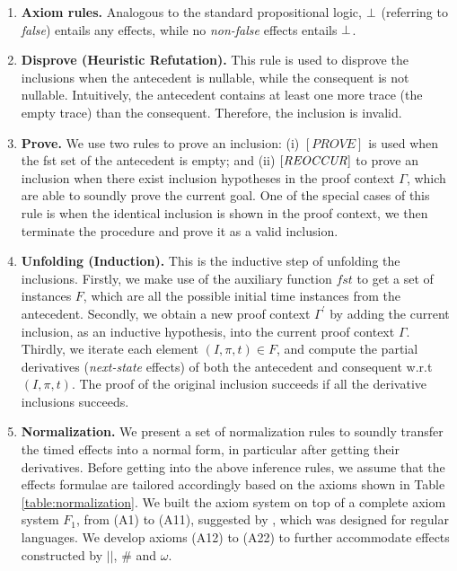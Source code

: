 \documentclass[acmsmall,review,anonymous]{acmart}\settopmatter{printfolios=true,printccs=false,printacmref=false}
\newcommand{\code}[1]{{\tt{\ensuremath{\m{#1}}}}}
\newcommand{\codeme}[1]{{\tt{\ensuremath{#1}}}}
\newcommand{\bott}{\textcolor{black}{\ensuremath{\bot}}}
\newcommand{\m}{\mathit}
\newcommand\tabref[1]{Table \textcolor{black}{\ref{#1}}.}
\begin{document}
\begin{enumerate}
\item 
\textbf{Axiom rules.}
\label{Base}
Analogous to  the standard propositional logic, \code{\bott} (referring to \textit{false}) entails any effects, while no \textit{non-false} effects entails \code{\bott}.


\item 
\textbf{Disprove (Heuristic Refutation).}
\label{Refutation}
This rule is used to disprove the inclusions when the antecedent is nullable, while the consequent is not nullable. Intuitively, the antecedent contains at least one more trace (the empty trace) than the consequent. Therefore, the inclusion is invalid. 

\vspace{-4mm}


\item 
\textbf{Prove.}
\label{Prove}
We use two rules to prove an inclusion: (i) \codeme{[PROVE]} is used when the fst set of the antecedent is empty; and (ii) $\code{[REOCCUR]}$ to prove an inclusion
when there exist inclusion hypotheses 
in the proof context $\m{\Gamma}$, which are able to soundly prove the current goal. One of the special cases of this rule is when the identical inclusion is shown in the proof context, we then terminate the procedure and prove it as a valid inclusion. 


\item 
\textbf{Unfolding (Induction).}
\label{unfolding}
This is the inductive step of unfolding the inclusions. Firstly, we make use of the auxiliary function \code{fst} to get a set of instances \code{F}, which are all the possible initial time instances from the antecedent. 
Secondly, we obtain a new proof context \code{\Gamma^\prime} by adding the current inclusion, as an inductive hypothesis, into the current proof context \code{\Gamma}. 
Thirdly, we iterate each element \code{(I, \pi, t) \in F}, and compute the partial derivatives (\emph{next-state} effects) of both the antecedent and consequent w.r.t \code{(I, \pi, t)}. The proof of the original inclusion succeeds if all the derivative inclusions succeeds.



\item 
\textbf{Normalization.}
We present a set of normalization rules to soundly transfer the timed effects into a normal form, in particular after getting their derivatives. 
Before getting into the above inference rules, we assume that the effects formulae are tailored accordingly based on the axioms shown in
\tabref{table:normalization}
We built the axiom system on top of a complete axiom system \code{F_1}, from (A1) to (A11), suggested by \cite{salomaa1966two}, which was designed for regular languages. We develop axioms (A12) to (A22) to further accommodate effects constructed by \code{||},   \code{\#} and \code{\omega}.




\end{enumerate}
\end{document}
